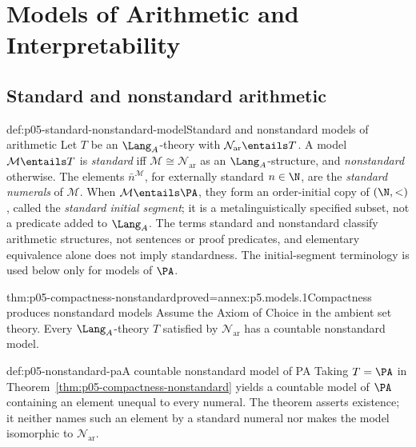 
\chapter{Models of Arithmetic and Interpretability}
\label{sec:p05-models-and-interpretability}

\section{Standard and nonstandard arithmetic}

\begin{hbdefinition}{def:p05-standard-nonstandard-model}{Standard and nonstandard models of arithmetic}
Let \(T\) be an \(\Lang_A\)-theory with
\(\mathcal N_{\mathrm{ar}}\entails T\).  A model
\(\mathcal M\entails T\) is \emph{standard} iff
\(\mathcal M\cong\mathcal N_{\mathrm{ar}}\) as an
\(\Lang_A\)-structure, and \emph{nonstandard} otherwise.  The elements
\(\bar n^{\mathcal M}\), for externally standard \(n\in\N\), are the
\emph{standard numerals} of \(\mathcal M\).  When
\(\mathcal M\entails\PA\), they form an order-initial copy of
\((\N,<)\), called the \emph{standard initial segment}; it is a
metalinguistically specified subset, not a predicate added to
\(\Lang_A\).  The terms standard and nonstandard classify arithmetic
structures, not sentences or proof predicates, and elementary equivalence
alone does not imply standardness.  The initial-segment terminology is used
below only for models of \(\PA\).
\end{hbdefinition}

\begin{hbtheorem}{thm:p05-compactness-nonstandard}{proved=annex:p5.models.1}{Compactness produces nonstandard models}
Assume the Axiom of Choice in the ambient set theory.  Every
\(\Lang_A\)-theory \(T\) satisfied by
\(\mathcal N_{\mathrm{ar}}\) has a countable nonstandard model.
\end{hbtheorem}

\begin{hbexample}{def:p05-nonstandard-pa}{A countable nonstandard model of PA}
Taking \(T=\PA\) in
Theorem~\ref{thm:p05-compactness-nonstandard} yields a countable model
of \(\PA\) containing an element unequal to every numeral.  The theorem
asserts existence; it neither names such an element by a standard numeral
nor makes the model isomorphic to \(\mathcal N_{\mathrm{ar}}\).
\end{hbexample}

